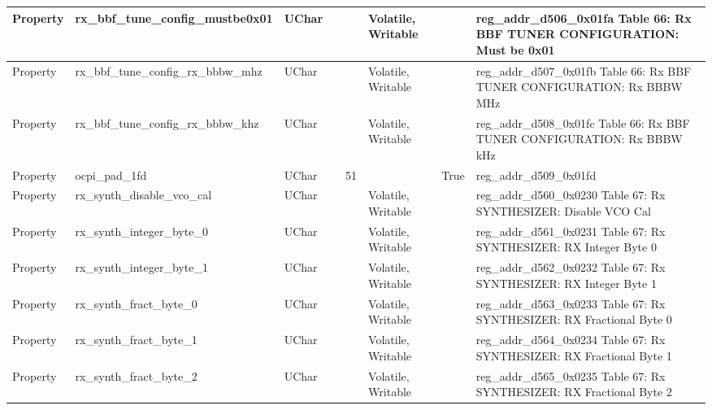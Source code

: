 \documentclass{article}
\begin{document}
\begin{scriptsize}
\begin{longtable}{|p{2cm}|p{5cm}|p{1cm}|p{2cm}|p{2cm}|p{1.75cm}|p{1.5cm}|p{5.1cm}|}
  \hline
  Property & rx\_bbf\_tune\_config\_mustbe0x01                        & UChar &                  &                  & Volatile,  Writable &         & reg\_addr\_d506\_0x01fa Table 66: Rx BBF TUNER CONFIGURATION: Must be 0x01 \\
  \hline
  Property & rx\_bbf\_tune\_config\_rx\_bbbw\_mhz                     & UChar &                  &                  & Volatile,  Writable &         & reg\_addr\_d507\_0x01fb Table 66: Rx BBF TUNER CONFIGURATION: Rx BBBW MHz \\
  \hline
  Property & rx\_bbf\_tune\_config\_rx\_bbbw\_khz                     & UChar &                  &                  & Volatile,  Writable &         & reg\_addr\_d508\_0x01fc Table 66: Rx BBF TUNER CONFIGURATION: Rx BBBW kHz \\
  \hline
  Property & ocpi\_pad\_1fd                                           & UChar &                  & 51               &                     & True    & reg\_addr\_d509\_0x01fd \\
  \hline
  Property & rx\_synth\_disable\_vco\_cal                             & UChar &                  &                  & Volatile,  Writable &         & reg\_addr\_d560\_0x0230 Table 67: Rx SYNTHESIZER: Disable VCO Cal \\
  \hline
  Property & rx\_synth\_integer\_byte\_0                              & UChar &                  &                  & Volatile,  Writable &         & reg\_addr\_d561\_0x0231 Table 67: Rx SYNTHESIZER: RX Integer Byte 0 \\
  \hline
  Property & rx\_synth\_integer\_byte\_1                              & UChar &                  &                  & Volatile,  Writable &         & reg\_addr\_d562\_0x0232 Table 67: Rx SYNTHESIZER: RX Integer Byte 1 \\
  \hline
  Property & rx\_synth\_fract\_byte\_0                                & UChar &                  &                  & Volatile,  Writable &         & reg\_addr\_d563\_0x0233 Table 67: Rx SYNTHESIZER: RX Fractional Byte 0 \\
  \hline
  Property & rx\_synth\_fract\_byte\_1                                & UChar &                  &                  & Volatile,  Writable &         & reg\_addr\_d564\_0x0234 Table 67: Rx SYNTHESIZER: RX Fractional Byte 1 \\
  \hline
  Property & rx\_synth\_fract\_byte\_2                                & UChar &                  &                  & Volatile,  Writable &         & reg\_addr\_d565\_0x0235 Table 67: Rx SYNTHESIZER: RX Fractional Byte 2 \\

\end{longtable}
\end{scriptsize}
\end{document}
